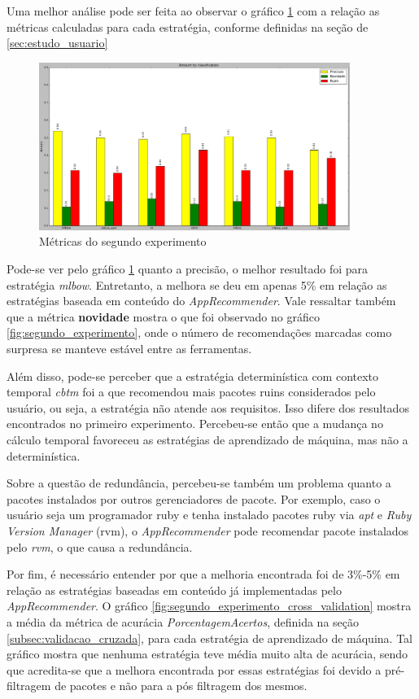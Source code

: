 Uma melhor análise pode ser feita ao observar o gráfico
\ref{fig:metricas_segundo_experimento} com a relação as métricas calculadas para cada
estratégia, conforme definidas na seção de \ref{sec:estudo_usuario}

\begin{figure}[h]
  \centering
  \includegraphics[width=0.9\textwidth]{figuras/metricas_segundo_experimento.eps}
  \caption{Métricas do segundo experimento}
  \label{fig:metricas_segundo_experimento}
\end{figure}

Pode-se ver pelo gráfico \ref{fig:metricas_segundo_experimento} quanto a
precisão, o melhor resultado foi para estratégia \textit{mlbow}. Entretanto, a
melhora se deu em apenas 5\% em relação as estratégias baseada em conteúdo do
\textit{AppRecommender}. Vale ressaltar também que a métrica \textbf{novidade}
mostra o que foi observado no gráfico \ref{fig:segundo_experimento}, onde o
número de recomendações marcadas como surpresa se manteve estável entre as
ferramentas.

Além disso, pode-se perceber que a estratégia determinística com contexto
temporal \textit{cbtm} foi a que recomendou mais pacotes ruins considerados pelo
usuário, ou seja, a estratégia não atende aos requisitos. Isso difere dos
resultados encontrados no primeiro experimento. Percebeu-se então que a mudança
no cálculo temporal favoreceu as estratégias de aprendizado de máquina, mas não
a determinística.

Sobre a questão de redundância, percebeu-se também um problema quanto a pacotes
instalados por outros gerenciadores de pacote. Por exemplo, caso o usuário seja
um programador ruby e tenha instalado pacotes ruby via \textit{apt} e
\textit{Ruby Version Manager} (rvm), o \textit{AppRecommender} pode recomendar
pacote instalados pelo \textit{rvm}, o que causa a redundância.

Por fim, é necessário entender por que a melhoria encontrada foi de 3\%-5\% em
relação as estratégias baseadas em conteúdo já implementadas pelo
\textit{AppRecommender}. O gráfico \ref{fig:segundo_experimento_cross_validation}
mostra a média da métrica de acurácia \textit{PorcentagemAcertos}, definida na seção
\ref{subsec:validacao_cruzada}, para cada estratégia de aprendizado de máquina.
Tal gráfico mostra que nenhuma estratégia teve média muito alta de acurácia, sendo
que acredita-se que a melhora encontrada por essas estratégias foi devido a
pré-filtragem de pacotes e não para a pós filtragem dos mesmos.

